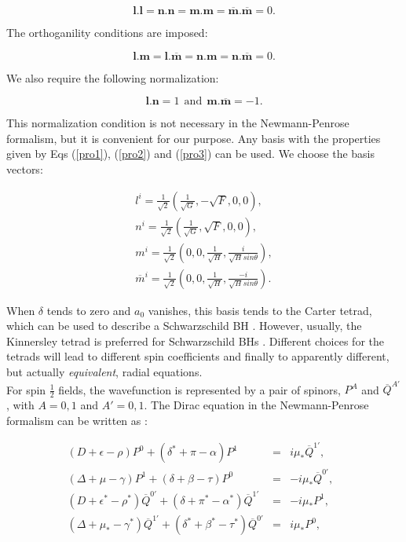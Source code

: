 \documentclass[twocolumn,amsmath,amssymb,prl,10pt,nofootinbib,superscriptaddress]{revtex4}
\def\be{\begin{equation}}
\def\ee{\end{equation}}
\def\bea{\begin{eqnarray}}
\def\eea{\end{eqnarray}}
\begin{document}
\be
\textbf{l}.\textbf{l}=\textbf{n}.\textbf{n}=\textbf{m}.\textbf{m}=\overline{\textbf{m}}.\overline{\textbf{m}}=0.
\label{pro1}
\ee

\noindent The orthoganility conditions are imposed: 

\be
\textbf{l}.\textbf{m}=\textbf{l}.\overline{\textbf{m}}=\textbf{n}.\textbf{m}=\textbf{n}.\overline{\textbf{m}}=0.
\label{pro2}
\ee

\noindent We also require the following normalization: 

\be
\textbf{l}.\textbf{n}=1 \ \ \mathrm{and} \ \ \textbf{m}.\overline{\textbf{m}}=-1.
\label{pro3}
\ee


\noindent This normalization condition is not necessary in the Newmann-Penrose formalism, but it is convenient for our purpose. Any basis with the properties given by Eqs (\ref{pro1}), (\ref{pro2}) and (\ref{pro3}) can be used. We choose the basis vectors:

\bea
l^i=\frac{1}{\sqrt{2}} \left( \frac{1}{\sqrt{G}}, -\sqrt{F}, 0, 0 \right), \\
n^i=\frac{1}{\sqrt{2}} \left( \frac{1}{\sqrt{G}}, \sqrt{F}, 0, 0 \right), \\
m^i=\frac{1}{\sqrt{2}} \left( 0, 0, \frac{1}{\sqrt{H}},\frac{i}{\sqrt{H} sin \theta}\right),  \\
\overline{m}^i=\frac{1}{\sqrt{2}} \left( 0, 0, \frac{1}{\sqrt{H}},\frac{-i}{\sqrt{H} sin \theta}\right).
\eea

When $\delta$ tends to zero and $a_0$ vanishes, this basis tends to the Carter tetrad, which can be used to describe a Schwarzschild BH \cite{batic2017}. However, usually, the Kinnersley tetrad is preferred for Schwarzschild BHs \cite{Chandrasekhar:1985kt}. Different choices for the tetrads will lead to different spin coefficients and finally to apparently different, but actually \textit{equivalent}, radial equations. \\

For spin $\frac{1}{2}$ fields,  the wavefunction is represented by a pair of spinors, $P^A$ and $\overline{Q}^{A'}$, with $A=0,1$ and $A'=0,1$.  The Dirac equation in the Newmann-Penrose formalism can be written as \cite{Chandrasekhar:1985kt}: 

\bea
(D + \epsilon - \rho) P^0 + (\delta ^* + \pi - \alpha) P^1  &=& i \mu _* \overline{Q}^{1'}, \label{un}   \\
(\Delta + \mu - \gamma) P^1 + (\delta  + \beta - \tau) P^0 &=& - i \mu _* \overline{Q}^{0'} \label{deux}, \ \ \  \\
(D + \epsilon ^*- \rho ^*) \overline{Q}^{0'} + (\delta  + \pi ^* - \alpha ^*) \overline{Q}^{1'} &=& - i \mu _*P^1,  \label{trois} \ \ \  \\
(\Delta + \mu _* - \gamma ^* ) \overline{Q}^{1'} + (\delta ^* + \beta ^* - \tau ^* )\overline{Q}^{0'} &=& i \mu _*  P^0,   \ \label{quatre} 
\eea
\end{document}
